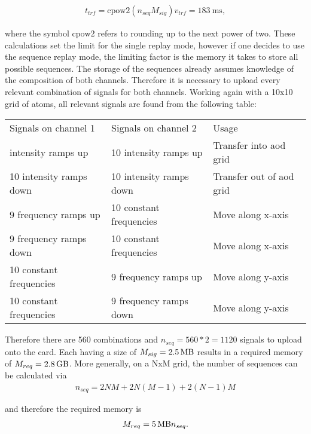 \begin{align}
	t_{trf} = \textrm{cpow2}(n_{seq} M_{sig}) v_{trf} = \SI{183}{\milli\second},
\end{align}

where the symbol $\textrm{cpow2}$ refers to rounding up to the next power of two.
These calculations set the limit for the single replay mode, however if one decides to use the sequence replay mode, the limiting factor is the memory it takes to store all possible sequences. The storage of the sequences already assumes knowledge of the composition of both channels. Therefore it is necessary to upload every relevant combination of signals for both channels. Working again with a 10x10 grid of atoms, all relevant signals are found from the following table:

\begin{table}[h!]
\label{tbl:eom_crystals}
\centering
\begin{tabular}{l|l|l}
	\hline \hline
		Signals on channel 1 & Signals on channel 2 & Usage \\ \thickhline
		10 intensity ramps up & 10 intensity ramps up & Transfer into \ac{aod} grid \\
		10 intensity ramps down & 10 intensity ramps down & Transfer out of \ac{aod} grid \\
		9 frequency ramps up & 10 constant frequencies & Move along x-axis \\
		9 frequency ramps down & 10 constant frequencies & Move along x-axis \\
		10 constant frequencies & 9 frequency ramps up & Move along y-axis \\
		10 constant frequencies & 9 frequency ramps down & Move along y-axis \\
	\hline \hline
\end{tabular}
\end{table}

Therefore there are 560 combinations and $n_{seq} = 560*2=1120$ signals to upload onto the card. Each having a size of $M_{sig} = \SI{2.5}{\mega\byte}$ results in a required memory of $M_{req}=\SI{2.8}{\giga\byte}$. More generally, on a NxM grid, the number of sequences can be calculated via
\begin{align}
	n_{seq} = 2 N M + 2 N (M-1) + 2 (N-1) M
\end{align}

and therefore the required memory is
\begin{align}
	M_{req} = \SI{5}{\mega\byte} n_{seq}.
\end{align}

